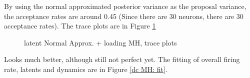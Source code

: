 \documentclass[]{article}
\begin{document}
By using the normal approximated posterior variance as the proposal variance, the acceptance rates are around 0.45 (Since there are 30 neurons, there are 30 acceptance rates).
The trace plots are in Figure \ref{dc MH: trace}
\begin{figure}[h!]
	\caption{latent Normal Approx. + loading MH, trace plots}
	\label{dc MH: trace}
\end{figure}

Looks much better, although still not perfect yet. The fitting of overall firing rate, latents and dynamics are in Figure \ref{dc MH: fit}.
\end{document}

